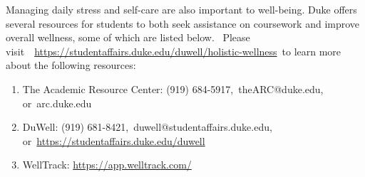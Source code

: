 \documentclass[11pt]{article}
\begin{document}
Managing daily stress and self-care are also important to well-being. Duke offers several resources for students to both seek assistance on coursework and improve overall wellness, some of which are listed below.  Please visit  \url{https://studentaffairs.duke.edu/duwell/holistic-wellness} to learn more about the following resources: 


\begin{enumerate}
\item The Academic Resource Center: (919) 684-5917, theARC@duke.edu, or arc.duke.edu
\item DuWell: (919) 681-8421, duwell@studentaffairs.duke.edu, or \url{https://studentaffairs.duke.edu/duwell}
\item WellTrack: \url{https://app.welltrack.com/}
\end{enumerate} 
\end{document}
